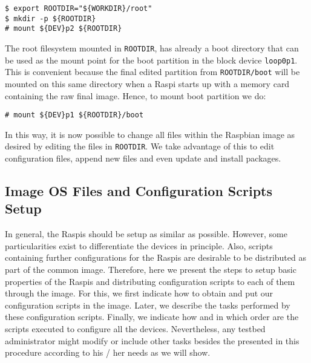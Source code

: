 \begin{lstlisting}[]
$ export ROOTDIR="${WORKDIR}/root"
$ mkdir -p ${ROOTDIR}
# mount ${DEV}p2 ${ROOTDIR}
\end{lstlisting}
\FloatBarrier
\vspace{-5mm}

The root filesystem mounted in \texttt{ROOTDIR}, has already a boot
directory that can be used as the mount point for the boot partition
in the block device \texttt{loop0p1}. This is convenient because
the final edited partition from \texttt{ROOTDIR/boot} will be mounted on
this same directory when a \ac{Raspi} starts up with a memory card
containing the raw final image. Hence, to mount boot partition we do:

\begin{lstlisting}[]
# mount ${DEV}p1 ${ROOTDIR}/boot
\end{lstlisting}
\FloatBarrier
\vspace{-5mm}

In this way, it is now possible to change all files within the Raspbian
image as desired by editing the files in \texttt{ROOTDIR}. We take
advantage of this to edit configuration files, append new files and even
update and install packages.

\subsection{Image OS Files and Configuration Scripts Setup}
In general, the \ac{Raspi}s should be setup as similar as possible. However,
some particularities exist to differentiate the devices in principle. Also,
scripts containing further configurations for the \ac{Raspi}s are desirable
to be distributed as part of the common image. Therefore, here we present
the steps to setup basic properties of the \ac{Raspi}s and distributing
configuration scripts to each of them through the image. For this, we first
indicate how to obtain and put our configuration scripts in the image. Later,
we describe the tasks performed by these configuration scripts. Finally, we
indicate how and in which order are the scripts executed to configure all the
devices. Nevertheless, any testbed administrator might modify or include other
tasks besides the presented in this procedure according to his / her needs
as we will show.

